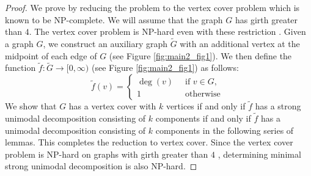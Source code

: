 \documentclass[11pt]{article}
\begin{document}
 \begin{proof}
 We prove by reducing the problem to the vertex cover problem which is known to be NP-complete. We will assume that the graph $G$ has girth greater than $4$. The vertex cover problem is NP-hard even with these restriction \cite{Mur92}. Given a graph $G$, we construct an auxiliary graph $\tilde{G}$ with an additional vertex at the midpoint of each edge of $G$ (see Figure \ref{fig:main2_fig1}). We then
 define the function $\tilde{f} : \tilde{G} \rightarrow [0,\infty)$ (see Figure \ref{fig:main2_fig1}) as follows: 
 \[
 \tilde{f}(v) = \begin{cases}
 \deg(v) & \ \text{ if $v \in G$}, \\
 1 & \ \text{ otherwise }
 \end{cases}
 \]
 We show that $G$ has a vertex cover with $k$ vertices if and only if $\tilde{f}$ has a strong unimodal decomposition consisting of $k$ components if and only if $\tilde{f}$ has a unimodal decomposition consisting of $k$ components in the following series of lemmas. This completes the reduction to vertex cover. Since the vertex cover problem is NP-hard on graphs with girth greater than $4$ \cite{Mur92}, determining minimal strong unimodal decomposition is also NP-hard.
\end{proof}
\end{document}
